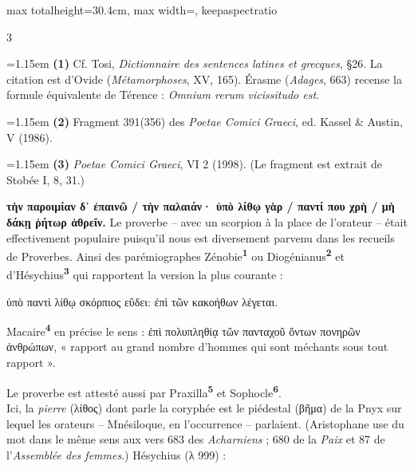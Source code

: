 \documentclass[11pt,twoside]{book}
\newcommand{\italique}[1]{\textit{#1}}
\newcommand{\citComm}[1]{\begin{quoting}[vskip=0.4pt,leftmargin=0.7em,rightmargin=0.2em]#1\end{quoting}}
\newcommand{\grec}[1]{{\policeGr #1}}
\newcommand{\latin}[1]{\textit{#1}}
\newcommand{\marqueur}[1]{\textsuperscript{\color{rubricRed}\textbf{#1}}}
\begin{document}
\begin{adjustbox}{max totalheight=30.4cm, max width=\textwidth, keepaspectratio}
\begin{minipage}{\textwidth}
{\begin{multicols}{3}
\par\vspace{1.5pt}
\par\vspace{1.2pt}\par\nopagebreak\vspace{1pt}\noindent\hangindent=1.15em {\color{sepiaNote}\textbf{(1)}} Cf. Tosi, \italique{Dictionnaire des sentences latines et grecques}, §26. La citation est d'Ovide (\italique{Métamorphoses}, XV, 165). Érasme (\italique{Adages}, 663) recense la formule équivalente de Térence : \latin{Omnium rerum vicissitudo est}.
\par\vspace{1.5pt}
\noindent\hangindent=1.15em {\color{sepiaNote}\textbf{(2)}} Fragment 391(356) des \italique{Poetae Comici Graeci}, ed. Kassel \& Austin, V (1986).
\par\vspace{1.5pt}
\noindent\hangindent=1.15em {\color{sepiaNote}\textbf{(3)}} \italique{Poetae Comici Graeci}, VI 2 (1998). (Le fragment est extrait de Stobée I, 8, 31.)
\par\vspace{1.5pt}
 \textbf{τὴν παροιμίαν δ᾽ ἐπαινῶ / τὴν παλαιάν· ὑπὸ λίθῳ γὰρ / παντί που χρὴ / μὴ δάκῃ ῥήτωρ ἀθρεῖν.} Le proverbe – avec un scorpion à la place de l'orateur – était effectivement populaire puisqu'il nous est diversement parvenu dans les recueils de Proverbes. Ainsi des parémiographes Zénobie\marqueur{1} ou Diogénianus\marqueur{2} et d'Hésychius\marqueur{3} qui rapportent la version la plus courante :
\citComm{ὑπὸ παντὶ λίθῳ σκόρπιος εὕδει: ἐπὶ τῶν κακοήθων λέγεται.}
\par\vspace{1.5pt}
\noindent Macaire\marqueur{4} en précise le sens : \grec{ἐπὶ πολυπληθίᾳ τῶν πανταχοῦ ὄντων πονηρῶν ἀνθρώπων}, « rapport au grand nombre d'hommes qui sont méchants sous tout rapport ».
\par\vspace{1.5pt}
\noindent Le proverbe est attesté aussi par Praxilla\marqueur{5} et Sophocle\marqueur{6}.\\ Ici, la \italique{pierre} (λίθος) dont parle la coryphée est le piédestal (βῆμα) de la Pnyx sur lequel les orateurs -- Mnésiloque, en l'occurrence -- parlaient. (Aristophane use du mot dans le même sens aux vers 683 des \italique{Acharniens} ; 680 de la \italique{Paix} et 87 de l'\italique{Assemblée des femmes}.) Hésychius (λ 999) :

\end{multicols}}
\end{minipage}
\end{adjustbox}
\end{document}
